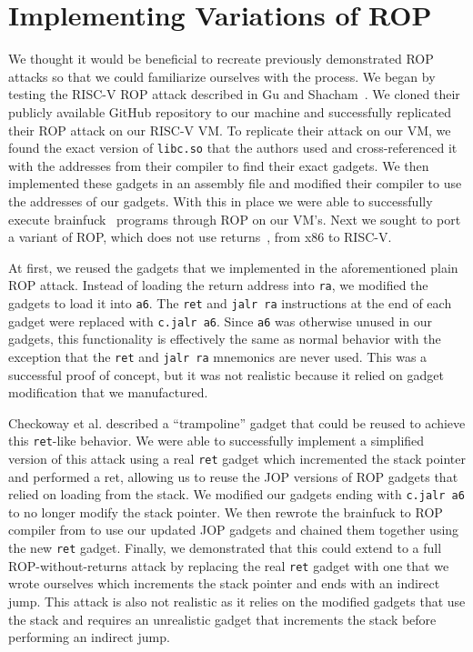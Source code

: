 \section{Implementing Variations of ROP}

We thought it would be beneficial to recreate previously demonstrated ROP attacks
so that we could familiarize ourselves with the process. We began by testing the
RISC-V ROP attack described in Gu and Shacham~\cite{gu20ropriscv}. We cloned
their publicly available GitHub repository to our machine and successfully
replicated their ROP attack on our RISC-V VM. To replicate their attack on our VM, we
found the exact version of \verb|libc.so| that the authors used and cross-referenced
it with the addresses from their compiler to find their exact gadgets. We then
implemented these gadgets in an assembly file and modified their compiler to use
the addresses of our gadgets. With this in place we were able to successfully execute
brainfuck~\cite{gu20ropriscv} programs through ROP on our VM's. Next we sought to port a variant of
ROP, which does not use returns~\cite{checkoway10ropnoret}, from x86 to RISC-V.

At first, we reused the gadgets that we implemented in the aforementioned plain ROP
attack. Instead of loading the return address into \verb|ra|, we modified the
gadgets to load it into \verb|a6|. The \verb|ret| and \verb|jalr ra|
instructions at the end of each gadget were replaced with \verb|c.jalr a6|.
Since \verb|a6| was otherwise unused in our gadgets, this functionality is
effectively the same as normal behavior with the exception that the \verb|ret|
and \verb|jalr ra| mnemonics are never used. This was a successful proof of
concept, but it was not realistic because it relied on gadget modification that
we manufactured.

Checkoway et al. described a ``trampoline'' gadget that could be reused to
achieve this \verb|ret|-like behavior. We were able to successfully implement
a simplified version of this attack using a real \verb|ret| gadget which incremented
the stack pointer and performed a ret, allowing us to reuse the JOP versions of ROP gadgets that
relied on loading from the stack. We modified our gadgets ending with \verb|c.jalr a6|
to no longer modify the stack pointer. We then rewrote the brainfuck to ROP compiler
from \cite{gu20ropriscv} to use our updated JOP gadgets and chained them together
using the new \verb|ret| gadget. Finally, we demonstrated that this could extend to a
full ROP-without-returns attack by replacing the real \verb|ret| gadget with one
that we wrote ourselves which increments the stack pointer and ends with an indirect jump.
This attack is also not realistic as it relies on the modified gadgets that use the stack
and requires an unrealistic gadget that increments the stack before performing an indirect jump.

